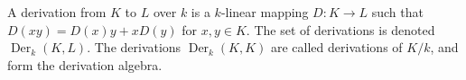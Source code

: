 A derivation from $K$ to $L$ over $k$ is a $k$-linear mapping $D: K \to L$ such that $D(xy) = D(x)y + xD(y)$ for $x, y \in K$. The set of derivations is denoted $\operatorname{Der}_k(K, L)$. The derivations $\operatorname{Der}_k(K, K)$ are called derivations of $K/k$, and form the derivation algebra.
